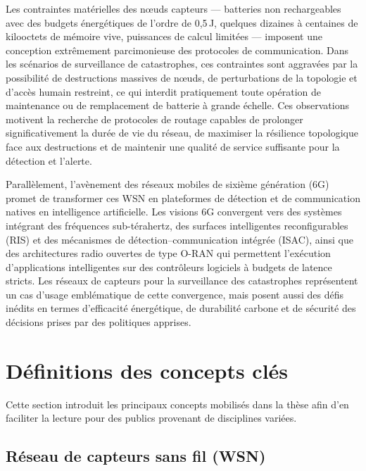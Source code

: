 Les contraintes matérielles des nœuds capteurs — batteries non rechargeables avec des budgets énergétiques de l'ordre de 0{,}5\,J, quelques dizaines à centaines de kilooctets de mémoire vive, puissances de calcul limitées — imposent une conception extrêmement parcimonieuse des protocoles de communication\cite{heinzelman2000leach,heinzelman2002leach,dietrich2009lifetime}. Dans les scénarios de surveillance de catastrophes, ces contraintes sont aggravées par la possibilité de destructions massives de nœuds, de perturbations de la topologie et d'accès humain restreint, ce qui interdit pratiquement toute opération de maintenance ou de remplacement de batterie à grande échelle\cite{erdelj2017disaster,alsayyed2025disaster}. Ces observations motivent la recherche de protocoles de routage capables de prolonger significativement la durée de vie du réseau, de maximiser la résilience topologique face aux destructions et de maintenir une qualité de service suffisante pour la détection et l'alerte.

Parallèlement, l'avènement des réseaux mobiles de sixième génération (6G) promet de transformer ces WSN en plateformes de détection et de communication natives en intelligence artificielle. Les visions 6G convergent vers des systèmes intégrant des fréquences sub-térahertz, des surfaces intelligentes reconfigurables (RIS) et des mécanismes de détection--communication intégrée (ISAC), ainsi que des architectures radio ouvertes de type O-RAN qui permettent l'exécution d'applications intelligentes sur des contrôleurs logiciels à budgets de latence stricts\cite{saad2020vision6g,polese2023oran,oran_official_architecture,etri_6g_disaster2024}. Les réseaux de capteurs pour la surveillance des catastrophes représentent un cas d'usage emblématique de cette convergence, mais posent aussi des défis inédits en termes d'efficacité énergétique, de durabilité carbone et de sécurité des décisions prises par des politiques apprises.

\section{Définitions des concepts clés}\label{sec:intro-definitions}

Cette section introduit les principaux concepts mobilisés dans la thèse afin d'en faciliter la lecture pour des publics provenant de disciplines variées.

\subsection*{Réseau de capteurs sans fil (WSN)}


